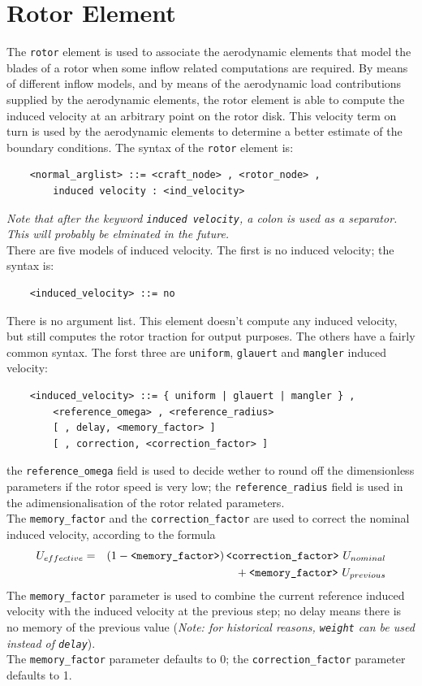 \section{Rotor Element}
The \texttt{rotor} element is used to associate the aerodynamic elements that
model the blades of a rotor when some inflow related computations are
required. By means of different inflow models, and by means of the
aerodynamic load contributions supplied by the aerodynamic elements, the
rotor element is able to compute the induced velocity at an arbitrary point on
the rotor disk. This velocity term on turn is used by the aerodynamic
elements to determine a better estimate of the boundary conditions.
The syntax of the \texttt{rotor} element is:
\begin{verbatim}
    <normal_arglist> ::= <craft_node> , <rotor_node> ,
        induced velocity : <ind_velocity>
\end{verbatim}
{\em 
    Note that after the keyword \texttt{induced velocity}, a colon is used as a
    separator. This will probably be elminated in the future.
} \\
There are five models of induced velocity. 
The first is no induced velocity; the syntax is:
\begin{verbatim}
    <induced_velocity> ::= no
\end{verbatim}
There is no argument list. This element doesn't compute any induced
velocity, but still computes the rotor traction for output purposes.
The others have a fairly common syntax. The forst three are
\texttt{uniform}, \texttt{glauert} and \texttt{mangler} induced velocity:
\begin{verbatim}
    <induced_velocity> ::= { uniform | glauert | mangler } , 
        <reference_omega> , <reference_radius> 
        [ , delay, <memory_factor> ]
        [ , correction, <correction_factor> ]
\end{verbatim}
the \texttt{reference\_omega} field is used to decide wether to round off the
dimensionless parameters if the rotor speed is very low; the
\texttt{reference\_radius} field is used in the adimensionalisation of the
rotor related parameters. \\
The \texttt{memory\_factor} and the \texttt{correction\_factor} are
used to correct the nominal induced velocity, according to the formula
\begin{eqnarray*}
	U_{effective} & = &
	\left( 1 - \texttt{<memory\_factor>} \right) 
		\texttt{<correction\_factor>} \ U_{nominal} \\
	& & \mbox{} + \texttt{<memory\_factor>} \ U_{previous}
\end{eqnarray*}
The \texttt{memory\_factor} parameter is used to
combine the current reference induced velocity with the induced velocity
at the previous step; no delay means there is no memory of the previous value 
(\emph{Note: for historical reasons, \texttt{weight} can be used 
instead of \texttt{delay}}). \\
The \texttt{memory\_factor} parameter defaults to 0; 
the \texttt{correction\_factor} parameter defaults to 1.

